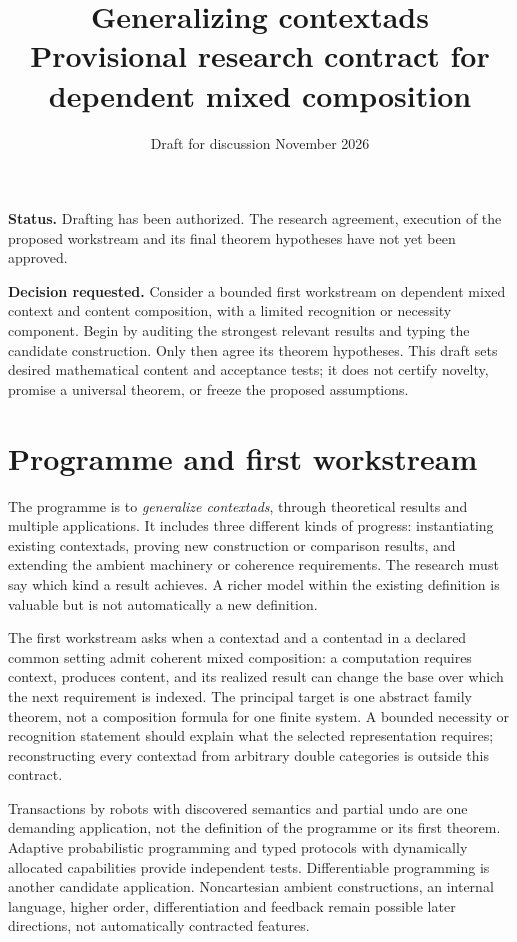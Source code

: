 \documentclass[11pt,a4paper]{article}
\title{Generalizing contextads\\[4pt]\large Provisional research contract for dependent mixed composition}
\author{}
\date{Draft for discussion\quad 1 November 2026}
\begin{document}
\maketitle
\vspace{-1.5em}

\textbf{Status.} Drafting has been authorized. The research agreement, execution
of the proposed workstream and its final theorem hypotheses have not yet been
approved.

\textbf{Decision requested.} Consider a bounded first workstream on dependent mixed
context and content composition, with a limited recognition or necessity
component. Begin by auditing the strongest relevant results and typing the
candidate construction. Only then agree its theorem hypotheses. This draft
sets desired mathematical content and acceptance tests; it does not certify
novelty, promise a universal theorem, or freeze the proposed assumptions.

\section{Programme and first workstream}

The programme is to \emph{generalize contextads}, through theoretical results
and multiple applications. It includes three different kinds of progress:
instantiating existing contextads, proving new construction or comparison
results, and extending the ambient machinery or coherence requirements.
The research must say which kind a result achieves. A richer model within the
existing definition is valuable but is not automatically a new definition.

The first workstream asks when a contextad and a contentad in a declared
common setting admit coherent mixed composition: a computation requires
context, produces content, and its realized result can change the base over
which the next requirement is indexed. The principal target is one abstract
family theorem, not a composition formula for one finite system. A bounded
necessity or recognition statement should explain what the selected
representation requires; reconstructing every contextad from arbitrary double
categories is outside this contract.

Transactions by robots with discovered semantics and partial undo are one
demanding application, not the definition of the programme or its first theorem.
Adaptive probabilistic programming and typed protocols with dynamically
allocated capabilities provide independent tests. Differentiable programming
is another candidate application. Noncartesian ambient constructions, an
internal language, higher order, differentiation and feedback remain possible
later directions, not automatically contracted features.
\end{document}
